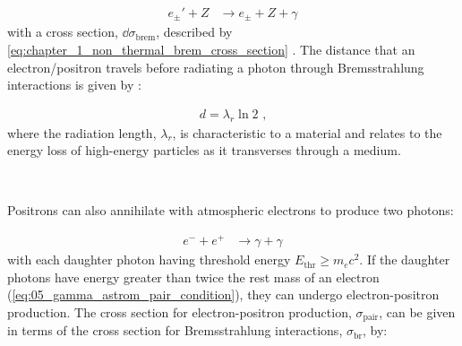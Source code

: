 \begin{equation}
    \begin{aligned}
    e_\pm' + Z & \rightarrow e_{\pm} + Z + \gamma
    \end{aligned}
\end{equation}
\noindent with a cross section, $\dd{\sigma}_\text{brem}$, described by \autoref{eq:chapter_1_non_thermal_brem_cross_section} . The distance that an electron/positron travels before radiating a photon through Bremsstrahlung interactions is given by \citep{MATTHEWS2005387}:

\begin{equation}
    \begin{aligned}
    d=\lambda_r \ln 2\text{ ,}
    \end{aligned}
\end{equation}
\noindent where the radiation length, $\lambda_r$, is characteristic to a material and relates to the energy loss of high-energy particles as it transverses through a medium.
\par~\par 
Positrons can also annihilate with atmospheric electrons to produce two photons:

\begin{equation}
    \begin{aligned}
    e^- + e^+&\rightarrow \gamma + \gamma
    \end{aligned}
\end{equation}
with each daughter photon having threshold energy $E_\text{thr}\geq m_ec^2$. If the daughter photons have energy greater than twice the rest mass of an electron (\autoref{eq:05_gamma_astrom_pair_condition}), they can undergo electron-positron production. The cross section for electron-positron production, $\sigma_\text{pair}$, can be given in terms of the cross section for Bremsstrahlung interactions, $\sigma_\text{br}$, by:

